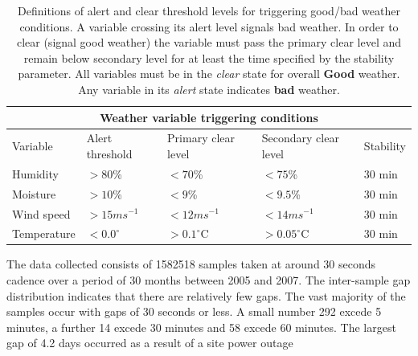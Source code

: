\begin{table}[htbp]
\begin{center}
\begin{tabular}{lllll}
\toprule
\multicolumn{5}{c}{Weather variable triggering conditions} \\
\midrule
Variable & Alert threshold & Primary clear level & Secondary clear level & Stability \\
\midrule
Humidity    &  $> 80$\%        & $< 70$\%         & $< 75$\%          & 30 min\\
Moisture    &  $> 10$\%        & $< 9$\%          & $< 9.5$\%         & 30 min\\
Wind speed  &  $> 15ms^{-1}$   & $< 12ms^{-1}$    & $< 14ms^{-1}$     & 30 min\\
Temperature &  $< 0.0^{\circ}$ & $> 0.1^{\circ}$C & $> 0.05^{\circ}$C & 30 min\\
\bottomrule
\end{tabular}
\end{center}
\caption[Definitions of alert and clear threshold levels for triggering good/bad weather conditions.]
{Definitions of alert and clear threshold levels for triggering good/bad weather conditions. A variable crossing its alert level signals bad weather. In order to clear (signal good weather) the variable must pass the primary clear level and remain below secondary level for at least the time specified by the stability parameter. All variables must be in the \emph{clear} state for overall {\bf Good} weather. Any variable in its \emph{alert} state indicates {\bf bad} weather.}
\label{tab:rcs_weather_rules}
\end{table}

The data collected consists of 1582518 samples taken at around 30 seconds cadence over a period of 30 months between 2005 and 2007. The inter-sample gap distribution indicates that there are relatively few gaps. The vast majority of the samples occur with gaps of 30 seconds or less. A small number 292 excede 5 minutes, a further 14 excede 30 minutes and 58 excede 60 minutes. The largest gap of 4.2 days occurred as a result of a site power outage


